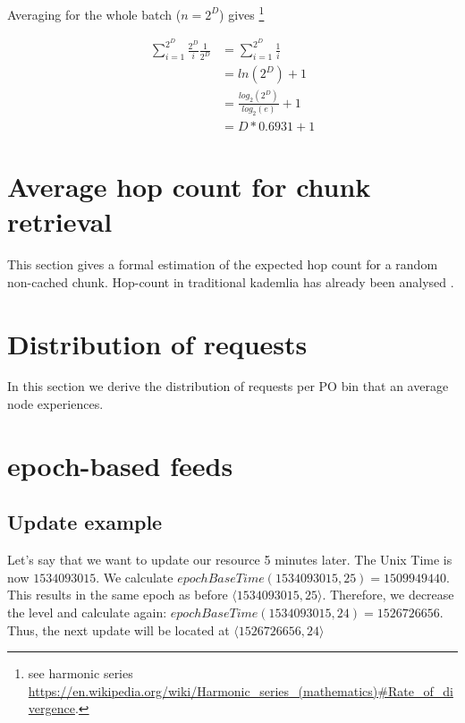 Averaging for the whole batch ($n=2^D$) gives%
%
\footnote{see harmonic series 
\url{https://en.wikipedia.org/wiki/Harmonic\_series\_(mathematics)\#Rate\_of\_divergence}.}

 \begin{subequations}   \begin{align}
\sum_{i=1}^{2^D}\frac{2^D}{i}\frac{1}{2^D}
&=\sum_{i=1}^{2^D}\frac{1}{i}\\
&=\mathit{ln}(2^D)+1\\
&=\frac{\mathit{log}_2(2^D)}{\mathit{log}_2(e)}+1\\
&=D*0.6931+1
\end{align} \end{subequations}

\section{Average hop count for chunk retrieval  \statusred}

This section gives a formal estimation of the expected hop count for a random non-cached chunk.  
Hop-count in traditional kademlia has already been  analysed \cite{roos2013comprehending, roos2015determining}.

\section{Distribution of requests \statusred}

In this section we derive the distribution of requests per PO bin that an average node experiences.

\section{epoch-based feeds \statusgreen}\label{sec:epoch-based-feeds-appendix}
\subsection{Update example \statusgreen}
 
Let's say that we want to update our resource 5 minutes later. The Unix Time is now $1534093015$.
We calculate $\mathit{epochBaseTime}(1534093015, 25) = 1509949440$.
This results in the same epoch as before $\langle  1534093015, 25\rangle$. Therefore, we decrease the level and calculate again:
$\mathit{epochBaseTime}(1534093015, 24) = 1526726656$. Thus, the next update will be located at $\langle  1526726656, 24\rangle$

